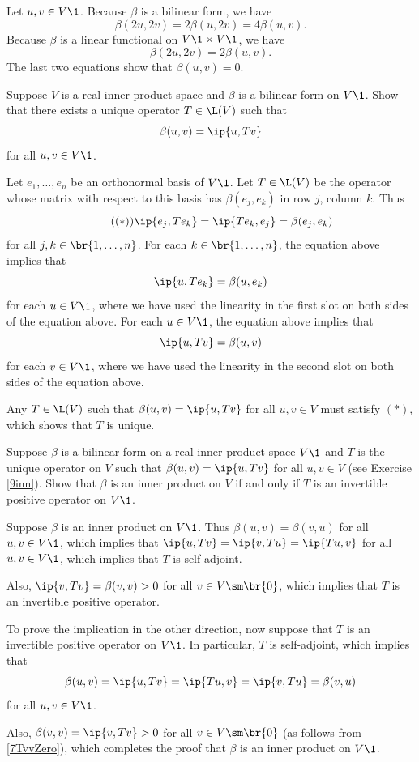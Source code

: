 \begin{Solution}
Let $u, v \in V\1$. Because $\beta$ is a bilinear form, we have
\[
\beta(2u, 2v) = 2 \beta(u, 2v) = 4 \beta(u, v).
\]
Because $\beta$ is a linear functional on $V\1 \times V\1$, we have
\[
\beta(2u, 2v) = 2 \beta(u, v).
\]
The last two equations show that $\beta(u, v) = 0$.
\end{Solution}

\exercise
Suppose $V$ is a real inner product space and $\beta$ is a bilinear form on $V\1$. Show that there exists a unique operator $T \in \L(V)$ such that\label{9inn}
\[
\beta(u, v) = \ip{u,Tv}
\]
for all $u, v \in V\1$.

\begin{Solution}
Let $e_1, \ldots, e_n$ be an orthonormal basis of $V\1$. Let $T \in \L(V)$ be the operator whose matrix with respect to this basis has $\beta(e_j, e_k)$ in row $j$, column $k$. Thus
\[ \tag{$(*)$}
\ip{e_j, Te_k} = \ip{Te_k, e_j} = \beta(e_j, e_k)
\]
for all $j, k \in \br{1, \ldots, n}$. For each $k \in \br{1, \ldots, n}$, the equation above implies that
\[
\ip{u, Te_k} = \beta(u, e_k)
\]
for each $u \in V\1$, where we have used the linearity in the first slot on both sides of the equation above. For each $u \in V\1$, the equation above implies that
\[
\ip{u, Tv} = \beta(u,v)
\]
for each $v \in V\1$, where we have used the linearity in the second slot on both sides of the equation above.

Any $T \in \L(V)$ such that $\beta(u, v) = \ip{u,Tv}$ for all $u,v \in V$ must satisfy $(*)$, which shows that $T$ is unique.
\end{Solution}

\exercise
Suppose $\beta$ is a bilinear form on a real inner product space $V\1$ and $T$ is the unique operator on $V$ such that $\beta(u,v) = \ip{u, Tv}$ for all $u, v \in V$ (see Exercise \ref{9inn}). Show that $\beta$ is an inner product on $V$ if and only if $T$ is an invertible positive operator on $V\1$.

\begin{Solution}
Suppose $\beta$ is an inner product on $V\1$. Thus $\beta(u,v) = \beta(v,u)$ for all $u, v \in V\1$, which implies that
$\ip{u,Tv} = \ip{v, Tu} = \ip{Tu,v}$ for all $u, v \in V\1$, which implies that $T$ is self-adjoint.

Also, $\ip{v, Tv} = \beta(v, v) > 0$ for all $v \in V \sm \br{0}$, which implies that $T$ is an invertible positive operator.

To prove the implication in the other direction, now suppose that $T$ is an invertible positive operator on $V\1$. In particular, $T$ is self-adjoint, which implies that
\[
\beta(u,v) = \ip{u,Tv} = \ip{Tu, v} = \ip{v, Tu} = \beta(v,u)
\]
for all $u, v \in V\1$.

Also, $\beta(v,v) = \ip{v, Tv} > 0$ for all $v \in V \sm \br{0}$ (as follows from \ref{7TvvZero}), which completes the proof that $\beta$ is an inner product on $V\1$.
\end{Solution}

